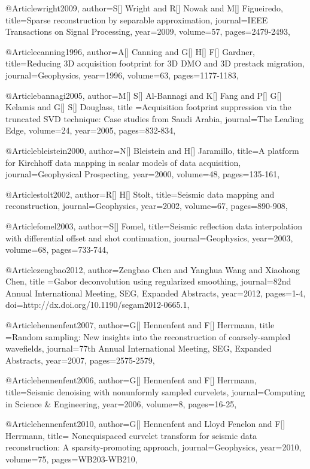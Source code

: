 @Article{wright2009,
  author={S[] Wright and R[] Nowak and M[] Figueiredo},
  title={Sparse reconstruction by separable approximation},
  journal={IEEE Transactions on Signal Processing},
  year=2009,
  volume=57,
  pages={2479-2493},
}

@Article{canning1996,
  author={A[] Canning and G[] H[] F[] Gardner},
  title={Reducing 3{D} acquisition footprint for 3{D} DMO and 3{D} prestack migration},
  journal={Geophysics},
  year=1996,
  volume=63,
  pages={1177-1183},
}

@Article{bannagi2005,
  author={M[] S[] Al-Bannagi and K[] Fang and P[] G[] Kelamis and G[] S[] Douglass},
  title ={Acquisition footprint suppression via the truncated SVD technique: Case studies from Saudi Arabia},
  journal={The Leading Edge},
  volume=24,
  year=2005,
  pages={832-834},
}

@Article{bleistein2000,
  author={N[] Bleistein and H[] Jaramillo},
  title={A platform for Kirchhoff data mapping in scalar models of data acquisition},
  journal={Geophysical Prospecting},
  year=2000,
  volume=48,
  pages={135-161},
}

@Article{stolt2002,
  author={R[] H[] Stolt},
  title={Seismic data mapping and reconstruction},
  journal={Geophysics},
  year=2002,
  volume=67,
  pages={890-908},
}


@Article{fomel2003,
  author={S[] Fomel},
  title={Seismic reflection data interpolation with differential offset and shot continuation},
  journal={Geophysics},
  year=2003,
  volume=68,
  pages={733-744},
}

@Article{zengbao2012,
  author={Zengbao Chen and Yanghua Wang and Xiaohong Chen},
  title ={Gabor deconvolution using regularized smoothing},
  journal={82nd Annual International Meeting, SEG, Expanded Abstracts},
  year=2012,
  pages={1-4},
  doi={http://dx.doi.org/10.1190/segam2012-0665.1},
}

@Article{hennenfent2007,
  author={G[] Hennenfent and F[] Herrmann},
  title ={Random sampling: New insights into the reconstruction of coarsely-sampled wavefields},
  journal={77th Annual International Meeting, SEG, Expanded Abstracts},
  year=2007,
  pages={2575-2579},
}

@Article{hennenfent2006,
  author={G[] Hennenfent and F[] Herrmann},
  title={Seismic denoising with nonunformly sampled curvelets},
  journal={Computing in Science \& Engineering},
  year=2006,
  volume=8,
  pages={16-25},
}

@Article{hennenfent2010,
  author={G[] Hennenfent and Lloyd Fenelon and F[] Herrmann},
  title={	
Nonequispaced curvelet transform for seismic data reconstruction: A sparsity-promoting approach},
  journal={Geophysics},
  year=2010,
  volume=75,
  pages={WB203-WB210},
}

